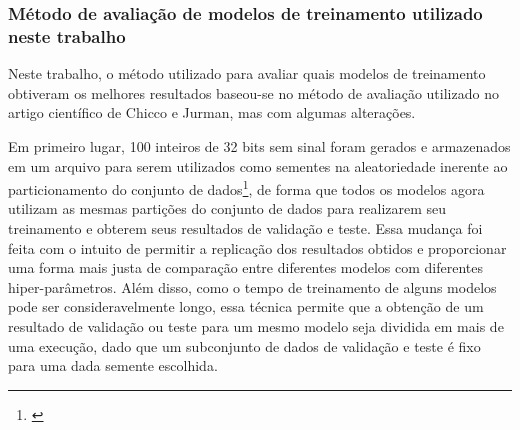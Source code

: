 \subsubsection{Método de avaliação de modelos de treinamento utilizado neste trabalho}

Neste trabalho, o método utilizado para avaliar quais modelos de treinamento obtiveram os melhores resultados baseou-se no método de avaliação utilizado no artigo científico de Chicco e Jurman, mas com algumas alterações.

Em primeiro lugar, 100 inteiros de 32 bits sem sinal foram gerados e armazenados em um arquivo para serem utilizados como sementes na aleatoriedade inerente ao particionamento do conjunto de dados\footnote{\cite{larxel_dataset}}, de forma que todos os modelos agora utilizam as mesmas partições do conjunto de dados para realizarem seu treinamento e obterem seus resultados de validação e teste. Essa mudança foi feita com o intuito de permitir a replicação dos resultados obtidos e proporcionar uma forma mais justa de comparação entre diferentes modelos com diferentes hiper-parâmetros. Além disso, como o tempo de treinamento de alguns modelos pode ser consideravelmente longo, essa técnica permite que a obtenção de um resultado de validação ou teste para um mesmo modelo seja dividida em mais de uma execução, dado que um subconjunto de dados de validação e teste é fixo para uma dada semente escolhida.

